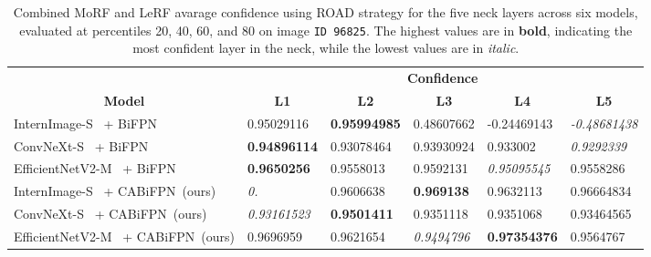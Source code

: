 \begin{table}[!htbp]
\begin{adjustbox}{max width=\textwidth}
\begin{tabular}{l|lllll|}
\cline{2-6}
\multicolumn{1}{c|}{} & \multicolumn{5}{c|}{\textbf{Confidence}} \\ \cline{1-1}
\multicolumn{1}{|c|}{\textbf{Model}} & \multicolumn{1}{c}{\textbf{L1}} & \multicolumn{1}{c}{\textbf{L2}} & \multicolumn{1}{c}{\textbf{L3}} & \multicolumn{1}{c}{\textbf{L4}} & \multicolumn{1}{c|}{\textbf{L5}} \\ \hline
\multicolumn{1}{|l|}{InternImage-S~\cite{wang2023internimage} + BiFPN~\cite{tan2020efficientdet}} & 0.95029116 & \textbf{0.95994985} & 0.48607662 & -0.24469143 & \textit{-0.48681438} \\
\multicolumn{1}{|l|}{ConvNeXt-S~\cite{liu2022convnet} + BiFPN~\cite{tan2020efficientdet}} & \textbf{0.94896114} & 0.93078464 & 0.93930924 & 0.933002 & \textit{0.9292339} \\
\multicolumn{1}{|l|}{EfficientNetV2-M~\cite{tan2021efficientnetv2} + BiFPN~\cite{tan2020efficientdet}} & \textbf{0.9650256} & 0.9558013 & 0.9592131 & \textit{0.95095545} & 0.9558286 \\ \hline
\multicolumn{1}{|l|}{InternImage-S~\cite{wang2023internimage} + CABiFPN~(ours)} & \textit{0.} & 0.9606638 & \textbf{0.969138} & 0.9632113 & 0.96664834 \\
\multicolumn{1}{|l|}{ConvNeXt-S~\cite{liu2022convnet} + CABiFPN~(ours)} & \textit{0.93161523} & \textbf{0.9501411} & 0.9351118 & 0.9351068 & 0.93464565 \\
\multicolumn{1}{|l|}{EfficientNetV2-M~\cite{tan2021efficientnetv2} + CABiFPN~(ours)} & 0.9696959 & 0.9621654 & \textit{0.9494796} & \textbf{0.97354376} & 0.9564767 \\ \hline
\end{tabular}
\end{adjustbox}
\caption[Combined MoRF and LeRF avarage confidence using ROAD strategy on image \texttt{ID 96825}.]{Combined MoRF and LeRF avarage confidence using ROAD strategy for the five neck layers across six models, evaluated at percentiles 20, 40, 60, and 80 on image \texttt{ID 96825}. The highest values are in \textbf{bold}, indicating the most confident layer in the neck, while the lowest values are in \textit{italic}.}
\label{tab:results:96825:comb-road}
\end{table}



